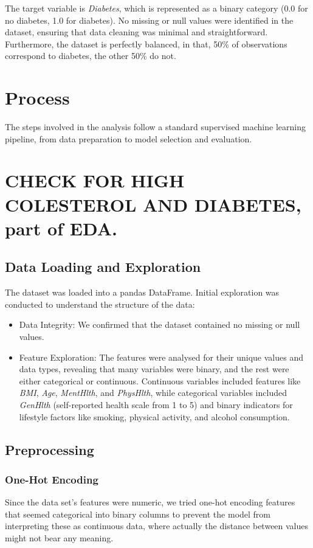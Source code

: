 \documentclass[a4paper,12pt]{article}
\begin{document}
The target variable is \textit{Diabetes}, which is represented as a binary category 
(0.0 for no diabetes, 1.0 for diabetes). No missing or null values were identified in the dataset, 
ensuring that data cleaning was minimal and straightforward. Furthermore, the dataset is perfectly 
balanced, in that, 50\% of observations correspond to diabetes, the other 50\% do not.


\section{Process}
The steps involved in the analysis follow a standard supervised machine learning pipeline, 
from data preparation to model selection and evaluation.

\section{CHECK FOR HIGH COLESTEROL AND DIABETES, part of EDA.}

\subsection{Data Loading and Exploration}
The dataset was loaded into a pandas DataFrame. Initial exploration was conducted to understand 
the structure of the data:
\begin{itemize}
    \item Data Integrity: We confirmed that the dataset contained no missing or null values.
    \item Feature Exploration: The features were analysed for their unique values and data 
    types, revealing that many variables were binary, and the rest were either categorical or 
    continuous. Continuous variables included features like \textit{BMI}, \textit{Age}, \textit{MentHlth}, 
    and \textit{PhysHlth}, while categorical variables included \textit{GenHlth} 
    (self-reported health scale from 1 to 5) and binary indicators for lifestyle factors like 
    smoking, physical activity, and alcohol consumption.
\end{itemize}

\subsection{Preprocessing}
\subsubsection{One-Hot Encoding}
Since the data set's features were numeric, we tried one-hot encoding features that seemed categorical
into binary columns to prevent the model from interpreting these as continuous data, where actually
the distance between values might not bear any meaning. 
\end{document}
